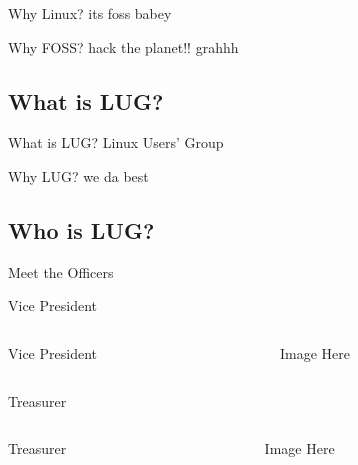 \documentclass{beamer}
\begin{document}
  \begin{frame}{Why Linux?}
    its foss babey
  \end{frame}
  
  \begin{frame}{Why FOSS?}
    hack the planet!! grahhh
  \end{frame}

  \subsection{What is LUG?}
  \begin{frame}{What is LUG?}
    Linux Users' Group
  \end{frame}

  \begin{frame}{Why LUG?}
    we da best
  \end{frame}

  \subsection{Who is LUG?}
  \begin{frame}
    
    {\Huge Meet the Officers}
  \end{frame}

  
  \begin{frame}{Vice President}
    \begin{columns}
      \begin{column}{0.6\textwidth}

        {\LARGE Vice President}\par
        
      \end{column}
      \begin{column}{0.4\textwidth}
        Image Here
      \end{column}
    \end{columns}
  \end{frame}

  \begin{frame}{Treasurer}
    \begin{columns}
      \begin{column}{0.6\textwidth}

        {\LARGE Treasurer}\par
        
      \end{column}
      \begin{column}{0.4\textwidth}
        Image Here
      \end{column}
    \end{columns}
  \end{frame}
\end{document}
